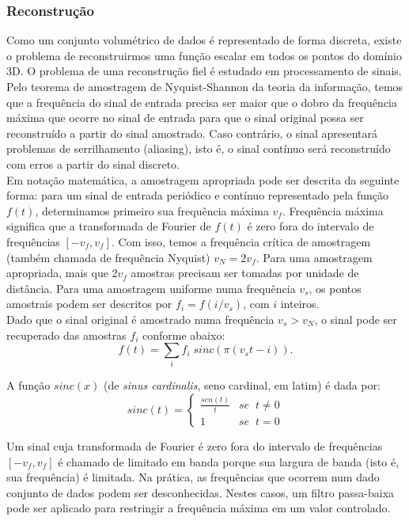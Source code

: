 \documentclass[12pt, a4paper, oneside]{book}
\begin{document}
\subsubsection{Reconstrução}

Como um conjunto volumétrico de dados é representado de forma discreta, existe o problema de reconstruirmos uma função escalar em todos os pontos do domínio 3D.
O problema de uma reconstrução fiel é estudado em processamento de sinais. \\

Pelo teorema de amostragem de Nyquist-Shannon da teoria da informação, temos que a frequência do sinal de entrada precisa ser maior que o dobro da frequência máxima que ocorre no sinal de entrada para que o sinal original possa ser reconstruído a partir do sinal amostrado. Caso contrário, o sinal apresentará problemas de serrilhamento (aliasing), isto é, o sinal contínuo será reconstruído com erros a partir do sinal discreto. \\

Em notação matemática, a amostragem apropriada pode ser descrita da seguinte forma: para um sinal de entrada periódico e contínuo representado pela função $f(t)$, determinamos primeiro sua frequência máxima $v_{f}$. Frequência máxima significa que a transformada de Fourier de $f(t)$ é zero fora do intervalo de frequências $[-v_{f}, v_{f}]$. Com isso, temos a frequência crítica de amostragem (também chamada de frequência Nyquist) $v_{N} = 2v_{f}$. Para uma amostragem apropriada, mais que $2v_{f}$ amostras precisam ser tomadas por unidade de distância. Para uma amostragem uniforme numa frequência $v_{s}$, os pontos amostrais podem ser descritos por $f_{i} = f(i/v_{s})$, com $i$ inteiros. \\

Dado que o sinal original é amostrado numa frequência $v_{s} > v_{N}$, o sinal pode ser recuperado das amostras $f_{i}$ conforme abaixo:
\[
	f(t) = \sum_{i} f_{i}\;sinc(\pi (v_{s}t - i)).
\]

A função $sinc(x)$ (de {\it sinus cardinalis}, seno cardinal, em latim) é dada por:
\[
	sinc(t) = \left\{ 
	\begin{array}{cl} 
	\frac{sen(t)}{t} & se\;\; t \neq 0  \\
	1 & se\;\; t = 0
	\end{array} \right. 
\]

Um sinal cuja transformada de Fourier é zero fora do intervalo de frequências $[-v_{f}, v_{f}]$ é chamado de limitado em banda porque sua largura de banda (isto é, sua frequência) é limitada. Na prática, as frequências que ocorrem num dado conjunto de dados podem ser desconhecidas. Nestes casos, um filtro passa-baixa pode ser aplicado para restringir a frequência máxima em um valor controlado. \\
\end{document}
